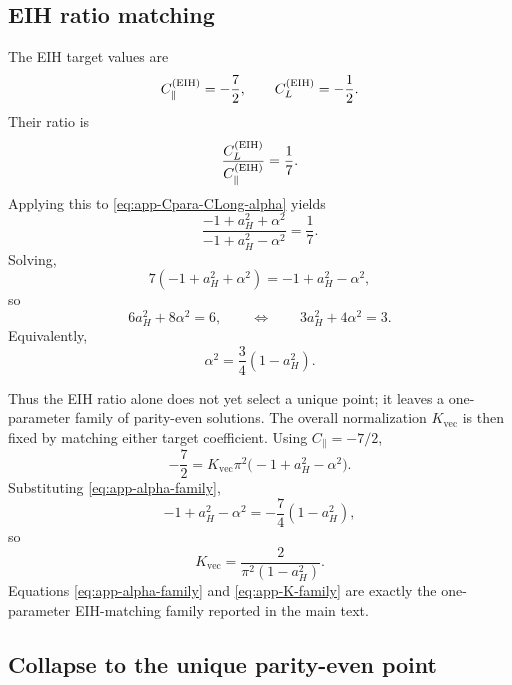 \documentclass[11pt]{article}
\newcommand{\Kvec}{K_{\mathrm{vec}}}
\newcommand{\alphaSq}{\alpha^2}
\newcommand{\Cpara}{C_{\parallel}}
\newcommand{\CLong}{C_{L}}
\begin{document}
\subsection{EIH ratio matching}
\label{app:wake-ratio}

The EIH target values are
\begin{equation}
\Cpara^{\rm(EIH)}=-\frac72,
\qquad
\CLong^{\rm(EIH)}=-\frac12.
\label{eq:app-EIH-targets}
\end{equation}
Their ratio is
\begin{equation}
\frac{\CLong^{\rm(EIH)}}{\Cpara^{\rm(EIH)}}=\frac{1}{7}.
\label{eq:app-EIH-ratio}
\end{equation}
Applying this to \eqref{eq:app-Cpara-CLong-alpha} yields
\begin{equation}
\frac{-1+a_H^2+\alphaSq}{-1+a_H^2-\alphaSq}=\frac{1}{7}.
\label{eq:app-ratio-equation}
\end{equation}
Solving,
\begin{equation}
7(-1+a_H^2+\alphaSq)= -1+a_H^2-\alphaSq,
\end{equation}
so
\begin{equation}
6a_H^2+8\alphaSq=6,
\qquad\Longleftrightarrow\qquad
3a_H^2+4\alphaSq=3.
\label{eq:app-family-constraint}
\end{equation}
Equivalently,
\begin{equation}
\boxed{
\alphaSq=\frac34(1-a_H^2).
}
\label{eq:app-alpha-family}
\end{equation}

Thus the EIH ratio alone does not yet select a unique point; it leaves a
one-parameter family of parity-even solutions. The overall normalization \(\Kvec\) is then
fixed by matching either target coefficient. Using \(\Cpara=-7/2\),
\begin{equation}
-\frac72
=
\Kvec\pi^2\bigl(-1+a_H^2-\alphaSq\bigr).
\label{eq:app-K-from-para}
\end{equation}
Substituting \eqref{eq:app-alpha-family},
\begin{equation}
-1+a_H^2-\alphaSq
=
-\frac74(1-a_H^2),
\end{equation}
so
\begin{equation}
\boxed{
\Kvec=\frac{2}{\pi^2(1-a_H^2)}.
}
\label{eq:app-K-family}
\end{equation}
Equations \eqref{eq:app-alpha-family} and \eqref{eq:app-K-family} are exactly the
one-parameter EIH-matching family reported in the main text.

\subsection{Collapse to the unique parity-even point}
\label{app:wake-unique-point}
\end{document}
